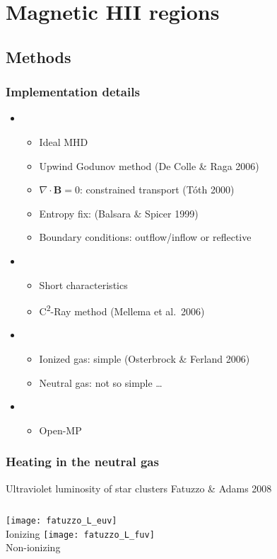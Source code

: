 \documentclass{beamer}
\newcommand\Ref[1]{\textcolor{white!70!black!90!yellow}{#1}}
\begin{document}
\section{Magnetic HII regions}

\subsection{Methods}

\begin{frame}
  \frametitle{Implementation details}
  \begin{itemize}
  \item {}
    \begin{itemize}
    \item Ideal MHD
    \item Upwind Godunov method \Ref{(De Colle \& Raga 2006)}
    \item \(\nabla \cdot \mathbf{B} = 0\): constrained transport \Ref{(Tóth 2000)}
    \item Entropy fix: \Ref{(Balsara \& Spicer 1999)}
    \item Boundary conditions: outflow/inflow or reflective
    \end{itemize}
  \item {}
    \begin{itemize}
    \item Short characteristics
    \item C\textsuperscript{2}-Ray method \Ref{(Mellema et al.\ 2006)}
    \end{itemize}
  \item {}
    \begin{itemize}
    \item Ionized gas: simple \Ref{(Osterbrock \& Ferland 2006)}
    \item Neutral gas: not so simple \dots
    \end{itemize}
  \item {}
    \begin{itemize}
    \item Open-MP
    \end{itemize}
  \end{itemize}
\end{frame}

\begin{frame}
  \frametitle{Heating in the neutral gas}
  \begin{block}{Ultraviolet luminosity of star clusters}
    \centering
    \Ref{Fatuzzo \& Adams 2008}\medskip
    \begin{columns}
      \centering
      \texttt{[image: fatuzzo\_L\_euv]}\\
      Ionizing
      \centering
      \texttt{[image: fatuzzo\_L\_fuv]}\\
      Non-ionizing
    \end{columns}
  \end{block}
\end{frame}
\end{document}
